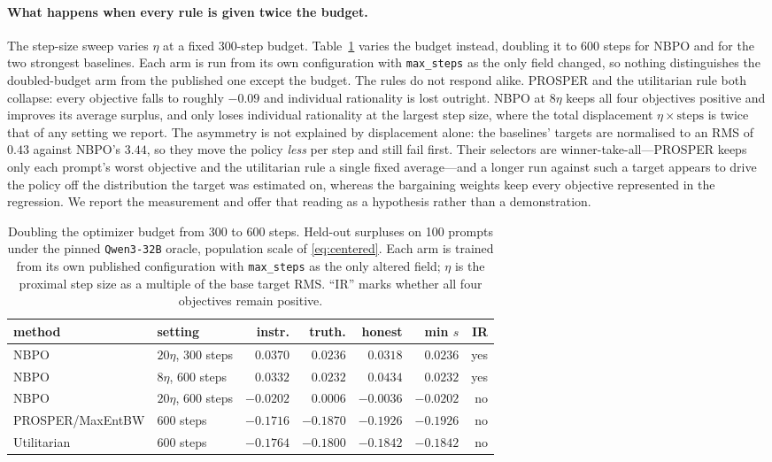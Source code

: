 \documentclass{article}
\theoremstyle{remark}
\theoremstyle{plain}
\newcommand{\NBPO}{\textsc{NBPO}}
\begin{document}
\paragraph{What happens when every rule is given twice the budget.}
The step-size sweep varies $\eta$ at a fixed 300-step budget. Table~\ref{tab:budget-robustness} varies the
budget instead, doubling it to 600 steps for \NBPO{} and for the two strongest baselines. Each arm is run
from its own configuration with \texttt{max\_steps} as the only field changed, so nothing distinguishes the
doubled-budget arm from the published one except the budget. The rules do not respond alike. PROSPER and
the utilitarian rule both collapse: every objective falls to roughly $-0.09$ and individual rationality is
lost outright. \NBPO{} at $8\eta$ keeps all four objectives positive and improves its average surplus, and
only loses individual rationality at the largest step size, where the total displacement $\eta \times
\text{steps}$ is twice that of any setting we report. The asymmetry is not explained by displacement alone:
the baselines' targets are normalised to an RMS of $0.43$ against \NBPO{}'s $3.44$, so they move the policy
\emph{less} per step and still fail first. Their selectors are winner-take-all---PROSPER keeps only each
prompt's worst objective and the utilitarian rule a single fixed average---and a longer run against such a
target appears to drive the policy off the distribution the target was estimated on, whereas the bargaining
weights keep every objective represented in the regression. We report the measurement and offer that
reading as a hypothesis rather than a demonstration.

\begin{table}[htbp]
\centering\footnotesize
\setlength{\tabcolsep}{4.0pt}
\caption{Doubling the optimizer budget from 300 to 600 steps. Held-out surpluses on 100 prompts under the
pinned \texttt{Qwen3-32B} oracle, population scale of \eqref{eq:centered}. Each arm is trained from its own
published configuration with \texttt{max\_steps} as the only altered field; $\eta$ is the proximal step
size as a multiple of the base target RMS. ``IR'' marks whether all four objectives remain positive.}
\label{tab:budget-robustness}
\begin{tabular}{llrrrrr}
\toprule
method & setting & instr. & truth. & honest & min $s$ & IR\\
\midrule
\NBPO{} & $20\eta$, 300 steps & $0.0370$ & $\mathbf{0.0236}$ & $0.0318$ & $\mathbf{0.0236}$ & yes\\
\NBPO{} & $8\eta$, 600 steps & $0.0332$ & $0.0232$ & $\mathbf{0.0434}$ & $0.0232$ & yes\\
\NBPO{} & $20\eta$, 600 steps & $-0.0202$ & $0.0006$ & $-0.0036$ & $-0.0202$ & no\\
\midrule
PROSPER/MaxEntBW & 600 steps & $-0.1716$ & $-0.1870$ & $-0.1926$ & $-0.1926$ & no\\
Utilitarian & 600 steps & $-0.1764$ & $-0.1800$ & $-0.1842$ & $-0.1842$ & no\\
\bottomrule
\end{tabular}
\end{table}
\end{document}
